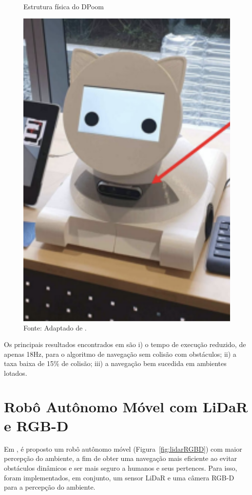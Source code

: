 \begin{figure}[h]
    \centering
    \caption{Estrutura física do DPoom}
    \includegraphics[scale=0.6]{dpoom.png}
    \caption*{Fonte: Adaptado de \citet{dpoom}.}
    \label{fig:dpoom}
\end{figure}

Os principais resultados encontrados em \citet{dpoom} são i) o tempo de execução reduzido,  de apenas 18Hz, para o algoritmo de navegação sem colisão com obstáculos; ii) a taxa baixa de 15\% de colisão; iii) a navegação bem sucedida em ambientes lotados.

\section{Robô Autônomo Móvel com LiDaR e RGB-D}
Em \citet{lidarRGBD},  é proposto um robô autônomo móvel (Figura~\ref{fig:lidarRGBD}) com maior percepção do ambiente, a fim de obter uma navegação mais eficiente ao evitar obstáculos dinâmicos e ser mais seguro a humanos e seus pertences. Para isso, foram implementados, em conjunto, um sensor LiDaR e uma câmera RGB-D para a percepção do ambiente. 

